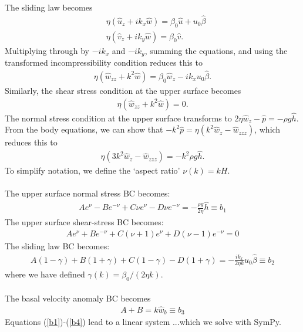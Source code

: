 \documentclass[paper=a4, fontsize=11pt]{article}
\begin{document}
The sliding law becomes
\begin{align}
&\eta( \widehat{u}_z + ik_x \widehat{w}) = \beta_0\widehat{u} + u_0\widehat{\beta} \\
&\eta( \widehat{v}_z + ik_y \widehat{w}) = \beta_0\widehat{v}.
\end{align}
Multiplying through by $-ik_x$ and $-ik_y$, summing the equations, and using the transformed incompressibility
condition reduces this to
\begin{align}
\eta(\widehat{w}_{zz} + k^2 \widehat{w}) = \beta_0 \widehat{w}_z - ik_x   u_0\widehat{\beta}.
\end{align}
Similarly, the shear stress condition at the upper surface becomes
\begin{align}
\eta(\widehat{w}_{zz} + k^2 \widehat{w}) =  0.
\end{align}
The normal stress condition at the upper surface transforms to
$
2\eta \widehat{w}_{z} - \widehat{p} = -\rho g \widehat{h}.
$
From the body equations, we can show that
$-k^2 \widehat{p} = \eta(k^2\widehat{w}_z - \widehat{w}_{zzz}) $, which reduces this to
\begin{align}
\eta (3k^2 \widehat{w}_{z}-\widehat{w}_{zzz})  = -k^2 \rho g \widehat{h}.
\end{align}
To simplify notation, we define the `aspect ratio' $\nu(k) = kH$.\\ \\
The upper surface normal stress BC becomes:
\begin{align}
{A} e^{\nu} - {B} e^{-\nu} + {C}\nu e^{\nu} - {D}\nu e^{-\nu}
=- \frac{\rho g }{2\eta }\widehat{h} \equiv b_1 \label{b1}
\end{align}
The upper surface shear-stress BC becomes:
\begin{align}
A e^{\nu} + B e^{-\nu} + C(\nu+1) e^{\nu} +D(\nu-1) e^{-\nu} =  0
\end{align}
The sliding law BC becomes:
\begin{align}
{A(1-\gamma)} + {B(1+\gamma)} + {C(1-\gamma)}  - {D(1+\gamma)} = -\frac{ ik_x }{2\eta k}u_0\widehat{\beta}\equiv b_2
\end{align}
where we have defined $\gamma(k) = \beta_0/(2\eta k)$. \\
\\ The basal velocity anomaly BC becomes
\begin{align}
{A} + {B}  = k\widehat{w}_b \equiv b_3 \label{b4}
\end{align}
Equations (\ref{b1})-(\ref{b4}) lead to a linear system
...which we solve with SymPy.\\ \\
\end{document}
